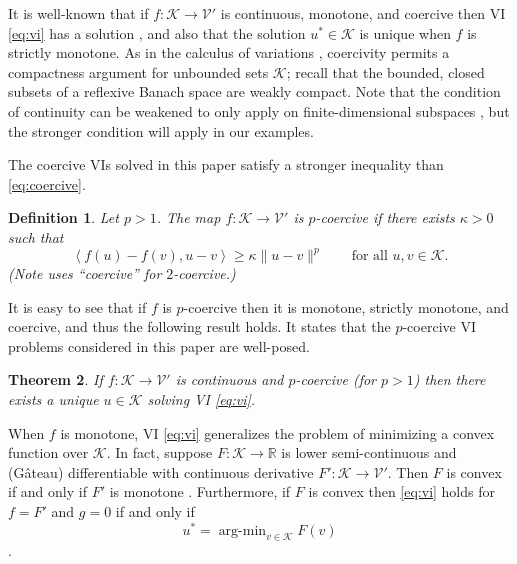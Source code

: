 \documentclass[letterpaper,final,12pt,reqno]{amsart}
\theoremstyle{cstyle}
\newtheorem{theorem}{Theorem}
\theoremstyle{cstyle*}
\theoremstyle{dstyle}
\newtheorem{definition}[theorem]{Definition}
\numberwithin{equation}{section}
\numberwithin{figure}{section}
\numberwithin{table}{section}
\numberwithin{theorem}{section}
\newcommand{\RR}{\mathbb{R}}
\newcommand{\cK}{\mathcal{K}}
\newcommand{\cV}{\mathcal{V}}
\newcommand{\ip}[2]{\left<#1,#2\right>}
\begin{document}
It is well-known that if $f:\cK \to \cV'$ is continuous, monotone, and coercive then VI \eqref{eq:vi} has a solution \cite[Corollary III.1.8]{KinderlehrerStampacchia1980}, and also that the solution $u^* \in \cK$ is unique when $f$ is strictly monotone.  As in the calculus of variations \cite{Evans2010}, coercivity permits a compactness argument for unbounded sets $\cK$; recall that the bounded, closed subsets of a reflexive Banach space are weakly compact.  Note that the condition of continuity can be weakened to only apply on finite-dimensional subspaces \cite{KinderlehrerStampacchia1980}, but the stronger condition will apply in our examples.

The coercive VIs solved in this paper satisfy a stronger inequality than \eqref{eq:coercive}.

\begin{definition}  Let $p>1$.  The map $f:\cK \to \cV'$ is \emph{$p$-coercive} if there exists $\kappa>0$ such that
\begin{equation}
\ip{f(u)-f(v)}{u-v} \ge \kappa \|u-v\|^p \qquad \text{for all } u,v \in \cK. \label{eq:pcoercive}
\end{equation}
(Note \cite{Tai2003} uses ``coercive'' for $2$-coercive.)
\end{definition}

It is easy to see that if $f$ is $p$-coercive then it is monotone, strictly monotone, and coercive, and thus the following result holds.  It states that the $p$-coercive VI problems considered in this paper are well-posed.

\begin{theorem}  \label{thm:viwellposed}  If $f:\cK \to \cV'$ is continuous and $p$-coercive (for $p>1$) then there exists a unique $u\in \cK$ solving VI \eqref{eq:vi}.
\end{theorem}

When $f$ is monotone, VI \eqref{eq:vi} generalizes the problem of minimizing a convex function over $\cK$.  In fact, suppose $F:\cK \to \RR$ is lower semi-continuous and (G\^ateau) differentiable with continuous derivative $F':\cK \to \cV'$.  Then $F$ is convex if and only if $F'$ is monotone \cite[Proposition I.5.5]{EkelandTemam1976}.  Furthermore, if $F$ is convex then \eqref{eq:vi} holds for $f=F'$ and $g=0$ if and only if
\begin{equation}
u^* = \operatorname{arg-min}_{v\in\cK} F(v) \label{eq:minimization}
\end{equation}
\cite[Proposition II.2.1]{EkelandTemam1976}.
\end{document}
